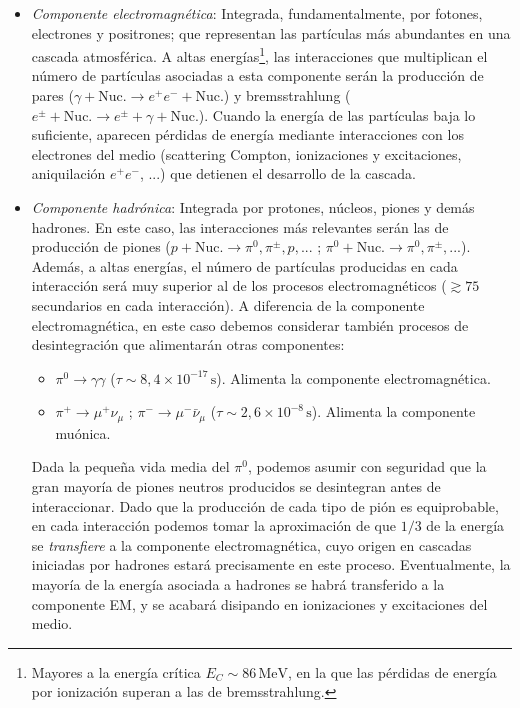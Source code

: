 \documentclass[12 pt, a4paper]{article} %
\numberwithin{equation}{section}
\numberwithin{figure}{section}
\numberwithin{table}{section}
\begin{document}
\begin{itemize}
	\item\textit{Componente electromagnética}: Integrada, fundamentalmente, por fotones, electrones y positrones; que representan las partículas más abundantes en una cascada atmosférica. A altas energías\footnote{ Mayores a la energía crítica $E_C\sim86\,\mathrm{MeV}$, en la que las pérdidas de energía por ionización superan a las de bremsstrahlung.}, las interacciones que multiplican el número de partículas asociadas a esta componente serán la producción de pares ($\gamma+\text{Nuc.}\rightarrow e^+e^-+\text{Nuc.}$) y bremsstrahlung ($e^\pm+\text{Nuc.}\rightarrow e^\pm+\gamma+\text{Nuc.}$). Cuando la energía de las partículas baja lo suficiente, aparecen pérdidas de energía mediante interacciones con los electrones del medio (scattering Compton, ionizaciones y excitaciones, aniquilación $e^+e^-$, ...) que detienen el desarrollo de la cascada.
	\item\textit{Componente hadrónica}: Integrada por protones, núcleos, piones y demás hadrones. En este caso, las interacciones más relevantes serán las de producción de piones ($p+\text{Nuc.}\rightarrow\pi^0,\pi^\pm,p,...$ ; $\pi^0+\text{Nuc.}\rightarrow \pi^0,\pi^\pm,...$). Además, a altas energías, el número de partículas producidas en cada interacción será muy superior al de los procesos electromagnéticos ($\gtrsim75$ secundarios en cada interacción). A diferencia de la componente electromagnética, en este caso debemos considerar también procesos de desintegración que alimentarán otras componentes:
	\begin{itemize}
		\item $\pi^0\rightarrow\gamma\gamma$ ($\tau\sim8,4\times10^{-17}\,\mathrm{s}$). Alimenta la componente electromagnética.
		\item  $\pi^+\rightarrow\mu^+\nu_\mu$ ; $\pi^-\rightarrow\mu^-\bar\nu_\mu$ ($\tau\sim2,6\times10^{-8}\,\mathrm{s}$). Alimenta la componente muónica.
	\end{itemize}
Dada la pequeña vida media del $\pi^0$, podemos asumir con seguridad que la gran mayoría de piones neutros producidos se desintegran antes de interaccionar. Dado que la producción de cada tipo de pión es equiprobable, en cada interacción podemos tomar la aproximación de que $1/3$ de la energía se \textit{transfiere} a la componente electromagnética, cuyo origen en cascadas iniciadas por hadrones estará precisamente en este proceso. Eventualmente, la mayoría de la energía asociada a hadrones se habrá transferido a la componente EM, y se acabará disipando en ionizaciones y excitaciones del medio.


\end{itemize}
\end{document}
